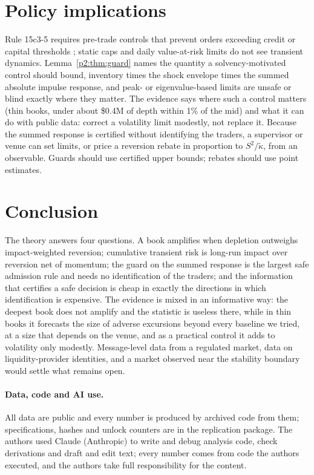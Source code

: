     \section{Policy implications}\label{p2:sec:policy}

    Rule 15c3-5 requires pre-trade controls that prevent orders exceeding credit or capital thresholds \citep{p2:sec2010}; static caps and daily value-at-risk limits do not see transient dynamics. Lemma~\ref{p2:thm:guard} names the quantity a solvency-motivated control should bound, inventory times the shock envelope times the summed absolute impulse response, and peak- or eigenvalue-based limits are unsafe or blind exactly where they matter. The evidence says where such a control matters (thin books, under about \$0.4M of depth within 1\% of the mid) and what it can do with public data: correct a volatility limit modestly, not replace it. Because the summed response is certified without identifying the traders, a supervisor or venue can set limits, or price a reversion rebate in proportion to $S^2/\tilde\kappa$, from an observable. Guards should use certified upper bounds; rebates should use point estimates.

    \section{Conclusion}\label{p2:sec:conclusion}

    The theory answers four questions. A book amplifies when depletion outweighs impact-weighted reversion; cumulative transient risk is long-run impact over reversion net of momentum; the guard on the summed response is the largest safe admission rule and needs no identification of the traders; and the information that certifies a safe decision is cheap in exactly the directions in which identification is expensive. The evidence is mixed in an informative way: the deepest book does not amplify and the statistic is useless there, while in thin books it forecasts the size of adverse excursions beyond every baseline we tried, at a size that depends on the venue, and as a practical control it adds to volatility only modestly. Message-level data from a regulated market, data on liquidity-provider identities, and a market observed near the stability boundary would settle what remains open.

    \paragraph{Data, code and AI use.} All data are public and every number is produced by archived code from them; specifications, hashes and unlock counters are in the replication package. The authors used Claude (Anthropic) to write and debug analysis code, check derivations and draft and edit text; every number comes from code the authors executed, and the authors take full responsibility for the content.
    
